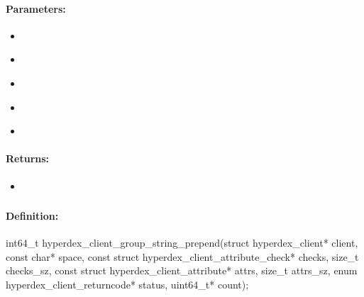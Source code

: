 \paragraph{Parameters:}
\begin{itemize}[noitemsep]
\item {}\\

\item {}\\

\item {}\\

\item {}\\

\item {}\\

\end{itemize}

\paragraph{Returns:}
\begin{itemize}[noitemsep]
\item {}\\

\end{itemize}

\pagebreak
\subsubsection{}
\label{api:c:group_string_prepend}


\paragraph{Definition:}
\begin{ccode}
int64_t hyperdex_client_group_string_prepend(struct hyperdex_client* client,
        const char* space,
        const struct hyperdex_client_attribute_check* checks, size_t checks_sz,
        const struct hyperdex_client_attribute* attrs, size_t attrs_sz,
        enum hyperdex_client_returncode* status,
        uint64_t* count);
\end{ccode}


